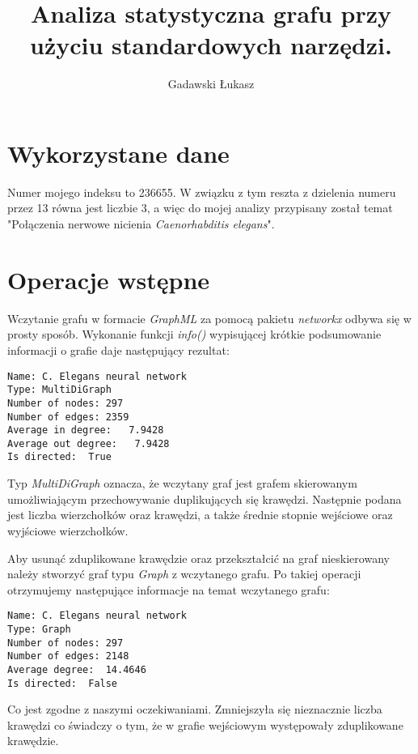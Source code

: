 \documentclass[10pt,a4paper]{article}
\author{Gadawski Łukasz}
\title{Analiza statystyczna grafu przy użyciu standardowych narzędzi.}
\begin{document}
\maketitle

\section{Wykorzystane dane}
Numer mojego indeksu to 236655. W związku z tym reszta z dzielenia numeru przez 13 równa jest liczbie 3, a więc do mojej analizy przypisany został temat "Połączenia nerwowe nicienia \textit{Caenorhabditis elegans}".

\section{Operacje wstępne}
Wczytanie grafu w formacie \textit{GraphML} za pomocą pakietu \textit{networkx} odbywa się w prosty sposób. Wykonanie funkcji \textit{info()} wypisującej krótkie podsumowanie informacji o grafie daje następujący rezultat:

\begin{verbatim}
Name: C. Elegans neural network
Type: MultiDiGraph
Number of nodes: 297
Number of edges: 2359
Average in degree:   7.9428
Average out degree:   7.9428
Is directed:  True
\end{verbatim}

Typ \textit{MultiDiGraph} oznacza, że wczytany graf jest grafem skierowanym umożliwiającym przechowywanie duplikujących się krawędzi. Następnie podana jest liczba wierzchołków oraz krawędzi, a także średnie stopnie wejściowe oraz wyjściowe wierzchołków.

Aby usunąć zduplikowane krawędzie oraz przekształcić na graf nieskierowany należy stworzyć graf typu \textit{Graph} z wczytanego grafu. Po takiej operacji otrzymujemy następujące informacje na temat wczytanego grafu:

\begin{verbatim}
Name: C. Elegans neural network
Type: Graph
Number of nodes: 297
Number of edges: 2148
Average degree:  14.4646
Is directed:  False
\end{verbatim}

Co jest zgodne z naszymi oczekiwaniami. Zmniejszyła się nieznacznie liczba krawędzi co świadczy o tym, że w grafie wejściowym występowały zduplikowane krawędzie.

\end{document}
